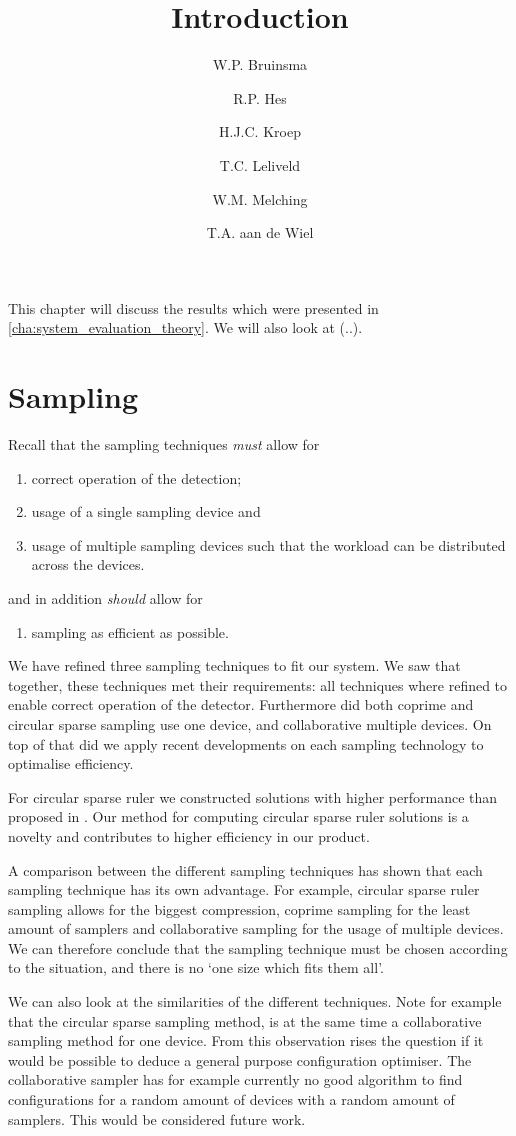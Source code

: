 \documentclass[a4paper, openany, oneside]{memoir}
\title{Introduction}
\author{W.P. Bruinsma \and R.P. Hes \and H.J.C. Kroep \and T.C. Leliveld \and W.M. Melching \and T.A. aan de Wiel}
\begin{document}
This chapter will discuss the results which were presented in \cref{cha:system_evaluation_theory}. We will also look at (..).

\section{Sampling}
Recall that the sampling techniques \emph{must} allow for
\begin{enumerate}
    \item correct operation of the detection;
    \item usage of a single sampling device and
    \item usage of multiple sampling devices such that the workload can be distributed across the devices.
\end{enumerate}
and in addition \emph{should} allow for
\begin{enumerate}
    \item sampling as efficient as possible.
\end{enumerate}

We have refined three sampling techniques to fit our system. We saw that together, these techniques met their requirements: all techniques where refined to enable correct operation of the detector. Furthermore did both coprime and circular sparse sampling use one device, and collaborative multiple devices. On top of that did we apply recent developments on each sampling technology to optimalise efficiency.  

For circular sparse ruler we constructed solutions with higher performance than proposed in \cite{ariananda2012compressive}. Our method for computing circular sparse ruler solutions is a novelty and contributes to higher efficiency in our product.

A comparison between the different sampling techniques has shown that each sampling technique has its own advantage. For example, circular sparse ruler sampling allows for the biggest compression, coprime sampling for the least amount of samplers and collaborative sampling for the usage of multiple devices. We can therefore conclude that the sampling technique must be chosen according to the situation, and there is no `one size which fits them all'. 

We can also look at the similarities of the different techniques. Note for example that the circular sparse sampling method, is at the same time a collaborative sampling method for one device. From this observation rises the question if it would be possible to deduce a  general purpose configuration optimiser. The collaborative sampler has for example currently no good algorithm to find configurations for a random amount of devices with a random amount of samplers. This would be considered future work.  
\end{document}
